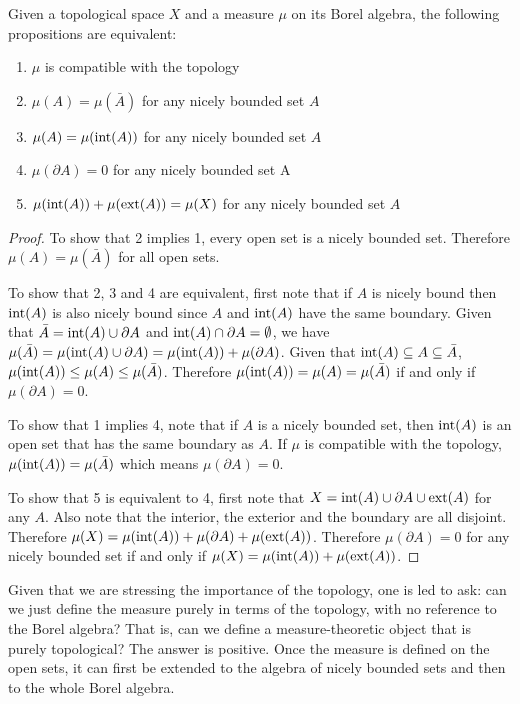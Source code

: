\begin{mathSection}
\begin{prop}
	Given a topological space $X$ and a measure $\mu$ on its Borel algebra, the following propositions are equivalent:
	\begin{enumerate}
		\item $\mu$ is compatible with the topology
		\item $\mu(A) = \mu(\bar{A})$ for any nicely bounded set $A$
		\item $\mu(A) = \mu(\operatorname{int}(A))$ for any nicely bounded set $A$
		\item $\mu(\partial A) = 0$ for any nicely bounded set A
		\item $\mu(\operatorname{int}(A)) + \mu(\operatorname{ext}(A)) = \mu(X)$ for any nicely bounded set $A$
	\end{enumerate}
\end{prop}

\begin{proof}
	To show that 2 implies 1, every open set is a nicely bounded set. Therefore $\mu(A) = \mu(\bar{A})$ for all open sets.
	
	To show that 2, 3 and 4 are equivalent, first note that if $A$ is nicely bound then $\operatorname{int}(A)$ is also nicely bound since $A$ and $\operatorname{int}(A)$ have the same boundary. Given that $\bar{A} = \operatorname{int}(A) \cup \partial A$ and $\operatorname{int}(A) \cap \partial A = \emptyset$, we have $\mu(\bar{A}) = \mu(\operatorname{int}(A) \cup \partial A) = \mu(\operatorname{int}(A)) + \mu(\partial A)$. Given that $\operatorname{int}(A) \subseteq A \subseteq \bar{A}$, $\mu(\operatorname{int}(A)) \leq \mu(A) \leq \mu(\bar{A})$. Therefore $\mu(\operatorname{int}(A)) = \mu(A) = \mu(\bar{A})$ if and only if $\mu(\partial A) = 0$.
	
	To show that 1 implies 4, note that if $A$ is a nicely bounded set, then $\operatorname{int}(A)$ is an open set that has the same boundary as $A$. If $\mu$ is compatible with the topology, $\mu(\operatorname{int}(A)) = \mu(\bar{A})$ which means $\mu(\partial A) = 0$.
	
	To show that 5 is equivalent to 4, first note that $X = \operatorname{int}(A) \cup \partial A \cup \operatorname{ext}(A)$ for any $A$. Also note that the interior, the exterior and the boundary are all disjoint. Therefore $\mu(X) = \mu(\operatorname{int}(A)) + \mu(\partial A) + \mu(\operatorname{ext}(A))$. Therefore $\mu(\partial A) = 0$ for any nicely bounded set if and only if $\mu(X) = \mu(\operatorname{int}(A)) + \mu(\operatorname{ext}(A))$.
\end{proof}
\end{mathSection}

Given that we are stressing the importance of the topology, one is led to ask: can we just define the measure purely in terms of the topology, with no reference to the Borel algebra? That is, can we define a measure-theoretic object that is purely topological? The answer is positive. Once the measure is defined on the open sets, it can first be extended to the algebra of nicely bounded sets and then to the whole Borel algebra.

